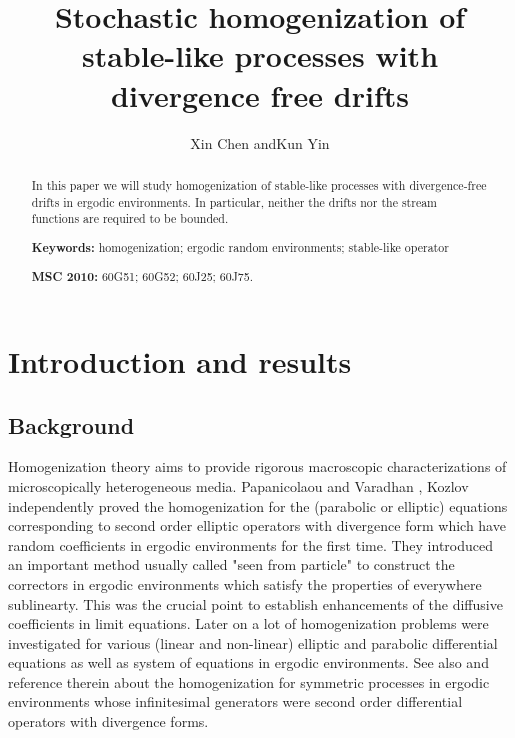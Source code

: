 \documentclass[11pt,draft, reqno]{amsart}
\theoremstyle{definition}
\numberwithin{equation}{section}
\begin{document}
\allowdisplaybreaks
\title[Stochastic homogenization of
stable-like processes with divergence free drifts] {\bfseries Stochastic homogenization of stable-like processes with divergence free drifts}
\author{Xin Chen \quad \hbox{and}\quad Kun Yin}

\date{}

\maketitle

\begin{abstract}
In this paper we will study homogenization of
 stable-like processes with divergence-free drifts in
ergodic environments. In particular, neither the drifts nor the
stream functions are required to be bounded.

\medskip

\noindent\textbf{Keywords:} homogenization;
ergodic random environments; stable-like operator

\medskip

\noindent \textbf{MSC 2010:} 60G51; 60G52; 60J25; 60J75.
\end{abstract}
\allowdisplaybreaks

\section{Introduction and results}\label{section1}

\subsection{Background}



Homogenization theory aims to provide rigorous macroscopic characterizations of microscopically heterogeneous media. Papanicolaou and Varadhan
\cite{PV}, Kozlov \cite{Koz} independently proved the homogenization for the (parabolic or elliptic) equations corresponding to
second order elliptic operators with divergence form which have random coefficients in ergodic environments for the first time. They introduced
an important method usually called "seen from particle" to construct the correctors in ergodic environments
which satisfy the properties of everywhere sublinearty. This
was the crucial point to establish enhancements of the diffusive coefficients in limit equations.
Later on a lot of homogenization problems  were investigated  for various (linear and non-linear) elliptic and parabolic differential equations as well as system of equations
in ergodic environments. See also \cite{BMW,CD,KLO,ZP} and reference therein about
the homogenization for symmetric processes in ergodic environments whose infinitesimal generators
were second order differential operators with divergence forms.
\end{document}
